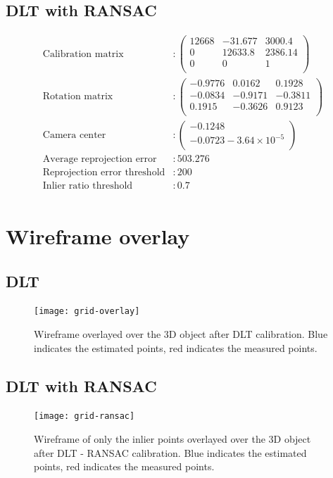 \documentclass[a4paper,11pt]{article}
\begin{document}
 \subsection*{DLT with RANSAC}
   \begin{align*}
  \text{Calibration matrix}
  &:
  \begin{pmatrix}
  12668 & -31.677 & 3000.4 \\
  0 & 12633.8 & 2386.14 \\
  0 & 0 & 1 \\
  \end{pmatrix}\\
  \text{Rotation matrix}
  &:
  \begin{pmatrix}
   -0.9776 & 0.0162 & 0.1928 \\
   -0.0834 & -0.9171 & -0.3811 \\
   0.1915 & -0.3626 & 0.9123 \\
  \end{pmatrix}\\
  \text{Camera center}
  &:
  \begin{pmatrix}
   -0.1248\\
   -0.0723
   -3.64\times10^{-5}\\
  \end{pmatrix}\\
  \text{Average reprojection error}
  &: 503.276\\
  \text{Reprojection error threshold}&: 200\\
  \text{Inlier ratio threshold}&: 0.7\\
  \end{align*}
 
 \section{Wireframe overlay}
 
 \subsection*{DLT}
      \begin{figure}[H]
      \centering
      \texttt{[image: grid-overlay]}
      \caption{Wireframe overlayed over the 3D object after DLT calibration. Blue indicates the estimated points, red indicates the measured points.}
      
    \end{figure}
    
    \subsection*{DLT with RANSAC}
    \begin{figure}[H]
      \centering
      \texttt{[image: grid-ransac]}
      \caption{Wireframe of only the inlier points overlayed over the 3D object after DLT - RANSAC calibration. Blue indicates the estimated points, red indicates the measured points.}
      \end{figure}
    
\end{document}
